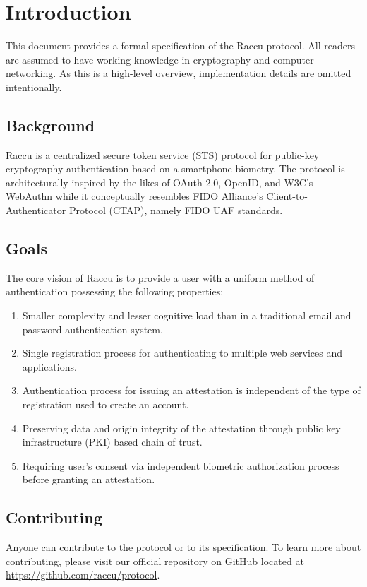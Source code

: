 \section{Introduction}
This document provides a formal specification of the Raccu protocol. All readers are assumed to have working 
knowledge in cryptography and computer networking. As this is a high-level overview, implementation details are 
omitted intentionally.

    \subsection{Background}
    Raccu is a centralized secure token service (STS) protocol for public-key cryptography authentication 
    based on a smartphone biometry. The protocol is architecturally inspired by the likes of OAuth 2.0, OpenID, 
    and W3C's WebAuthn while it conceptually resembles FIDO Alliance's Client-to-Authenticator Protocol (CTAP), 
    namely FIDO UAF standards.

    \subsection{Goals}
    The core vision of Raccu is to provide a user with a uniform method of authentication possessing the 
    following properties: 
        \begin{enumerate}
            \item Smaller complexity and lesser cognitive load than in a traditional email and password 
                  authentication system.
            \item Single registration process for authenticating to multiple web services and applications.
            \item Authentication process for issuing an attestation is independent of the type of registration 
                  used to create an account.
            \item Preserving data and origin integrity of the attestation through public key infrastructure (PKI) 
                  based chain of trust.
            \item Requiring user's consent via independent biometric authorization process before granting an 
                  attestation.
        \end{enumerate}

     \subsection{Contributing}
     Anyone can contribute to the protocol or to its specification. To learn more about contributing, please visit our 
     official repository on GitHub located at \href{https://github.com/raccu/protocol}{https://github.com/raccu/protocol}.

